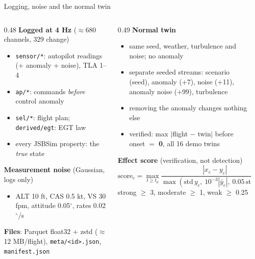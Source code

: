 \documentclass[aspectratio=169,11pt]{beamer}
\newcommand{\aside}[1]{{\color{muted}\small #1}}
\begin{document}
\begin{frame}{Logging, noise and the normal twin}
  \begin{columns}[T]
    \begin{column}{0.48\textwidth}
      \textbf{Logged at 4 Hz} \aside{($\approx$680 channels, 329 change)}
      \begin{itemize}\footnotesize
        \item \texttt{sensor/*}: autopilot readings (+ anomaly + noise), TLA 1--4
        \item \texttt{ap/*}: commands \emph{before} control anomaly
        \item \texttt{sel/*}: flight plan; \texttt{derived/egt}: EGT law
        \item every JSBSim property: the \emph{true} state
      \end{itemize}
      \textbf{Measurement noise} \aside{(Gaussian, logs only)}
      \begin{itemize}\footnotesize
        \item ALT 10 ft, CAS 0.5 kt, VS 30 fpm, attitude 0.05$^\circ$, rates 0.02$^\circ$/s
      \end{itemize}
      \textbf{Files}: Parquet float32 + zstd ($\approx$12 MB/flight), \texttt{meta/<id>.json}, \texttt{manifest.json}
    \end{column}
    \begin{column}{0.49\textwidth}
      \textbf{Normal twin}
      \begin{itemize}\footnotesize
        \item same seed, weather, turbulence and noise; no anomaly
        \item separate seeded streams: scenario (seed), anomaly (+7), noise (+11), anomaly noise (+99), turbulence
        \item removing the anomaly changes nothing else
        \item verified: max $|$flight $-$ twin$|$ before onset $=$ \textbf{0}, all 16 demo twins
      \end{itemize}
      \textbf{Effect score} \aside{(verification, not detection)}
      \[ \mathrm{score}_c = \max_{t\ge t_0}\frac{|x_c - y_c|}{\max(\mathrm{std}\,y_c,\ 10^{-3}|\bar y_c|,\ 0.05\,\mathrm{std}\,x_c)} \]
      \footnotesize strong $\ge$ 3, moderate $\ge$ 1, weak $\ge$ 0.25
    \end{column}
  \end{columns}
\end{frame}
\end{document}
